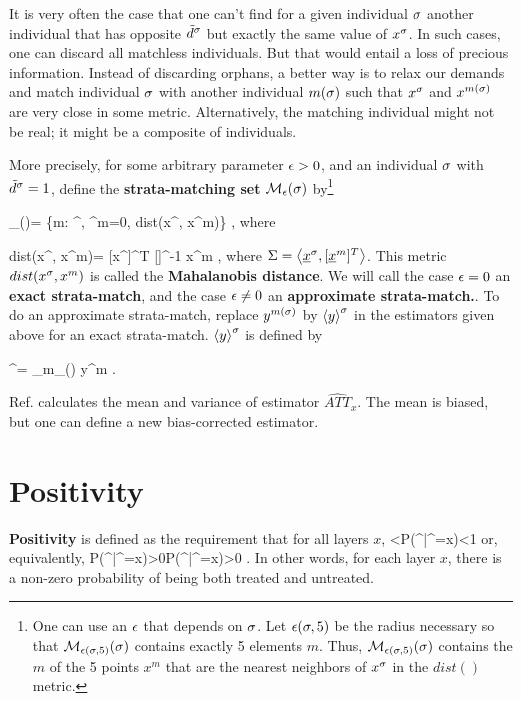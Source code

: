 It is very often
the case that
one can't
find for a given
individual $\sigma$
another individual that has
opposite ${\tilde{d}}^\sigma$ but
exactly the same value of $x^\sigma$.
In such cases, one can discard all
matchless individuals.
But that would entail a loss 
of precious information.
Instead of discarding orphans, 
a better way is to
relax our demands and
match individual $\sigma$
with another individual $m(\sigma)$
such that $x^\sigma$
and $x^{m(\sigma)}$ are very
close in some metric.
Alternatively, the matching
individual might 
not be real; it might
be a composite
of individuals.

More precisely, 
for some arbitrary
parameter $\epsilon>0$,
and an individual $\sigma$
with ${\tilde{d}}^\sigma=1$,
define
the {\bf strata-matching set} 
${\cal M}_{\epsilon}(\sigma)$ by\footnote{
One can use an $\epsilon$
that depends on $\sigma$.
Let $\epsilon(\sigma, 5)$
be the radius necessary
so that ${\cal M}_{\epsilon(\sigma, 5)}(\sigma)$
contains exactly 5 elements $m$.
Thus, ${\cal M}_{\epsilon(\sigma, 5)}(\sigma)$
contains the $m$ of the
 5 points $x^m$ that are the
nearest neighbors of $x^\sigma$
in the $dist()$ metric.}

\beq
\calm_{\eps}(\s)=
\{m: \td^, \td^m=0,
dist(x^\s, x^m)\leq \eps \}
\;,
\eeq
where

\beq
dist(x^\s, x^m)=
[x^\s]^T [\Sigma]^{-1} x^m
\;,
\eeq
where $\Sigma = \left\langle{\underline{x}}^\sigma, [{\underline{x}}^m]^T\right\rangle$.
 This
metric $dist(x^\sigma, x^m)$ is
called the {\bf Mahalanobis distance}.
We will call
the case $\epsilon=0$ an {\bf  exact strata-match},
and
the case
$\epsilon\neq 0$ 
 an {\bf approximate strata-match.}.
To do an approximate strata-match,
replace $y^{m(\sigma)}$ 
by
$\left\langle y\right\rangle^\sigma$ 
in 
the estimators 
given above 
for an exact strata-match.
$\left\langle y\right\rangle^\sigma$ 
is defined by

\beq
{}^\s=
\sum_{m\in \calm_{\eps}(\s)}
y^m
\;.
\eeq

Ref.\cite{book-mixtape}
calculates the mean and variance
of estimator $\widehat{ATT}_x$. 
The mean is biased,
but one can define a new
bias-corrected estimator.


\section{Positivity}


{\bf Positivity} is defined as the
requirement that for all layers $x$,
<P(\rvd^|\rvx^\s=x)<1
\eeq
or, equivalently, 
\beq
P(\rvd^|\rvx^\s=x)>0P(\rvd^|\rvx^\s=x)>0
\;.
\eeq
In other words, 
for each layer $x$,
there is
a non-zero
probability of being both treated 
and untreated.

